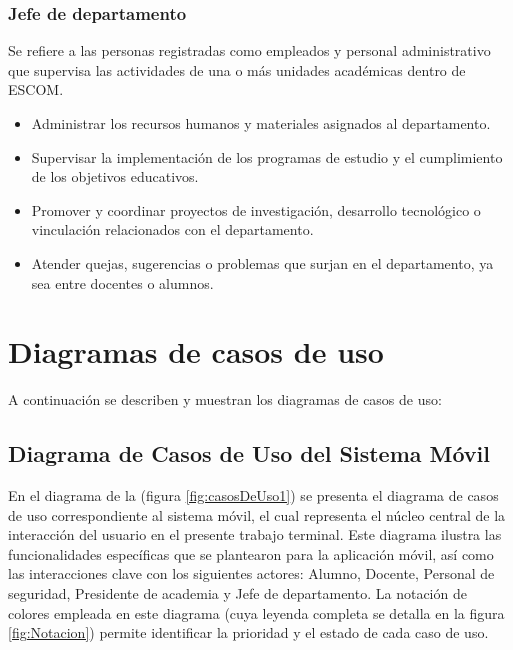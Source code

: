 \begin{Usuario}{\hypertarget{tJefe}{\subsubsection{Jefe de departamento}}}{
Se refiere a las personas registradas como empleados y personal administrativo que supervisa las actividades de una o más unidades académicas dentro de ESCOM.
}
\item[Responsabilidades:] \cdtEmpty
\begin{itemize}
\item Administrar los recursos humanos y materiales asignados al departamento.
\item Supervisar la implementación de los programas de estudio y el cumplimiento de los objetivos educativos.
\item Promover y coordinar proyectos de investigación, desarrollo tecnológico o vinculación relacionados con el departamento.
\item Atender quejas, sugerencias o problemas que surjan en el departamento, ya sea entre docentes o alumnos.
\end{itemize}
\end{Usuario}



\newpage

	\section{Diagramas de casos de uso}

A continuación se describen y muestran los diagramas de casos de uso:

\subsection{Diagrama de Casos de Uso del Sistema Móvil}

En el diagrama de la (figura \ref{fig:casosDeUso1}) se presenta el diagrama de casos de uso correspondiente al sistema móvil, el cual representa el núcleo central de la interacción del usuario en el presente trabajo terminal. Este diagrama ilustra las funcionalidades específicas que se plantearon para la aplicación móvil, así como las interacciones clave con los siguientes actores: Alumno, Docente, Personal de seguridad, Presidente de academia y Jefe de departamento. La notación de colores empleada en este diagrama (cuya leyenda completa se detalla en la figura \ref{fig:Notacion}) permite identificar la prioridad y el estado de cada caso de uso.

